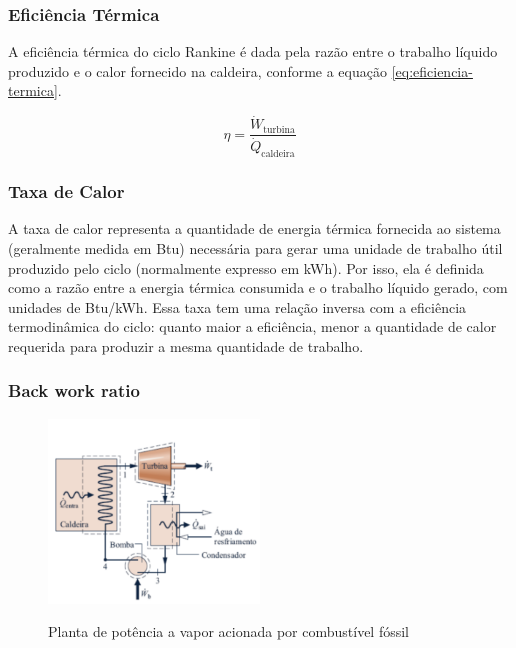 \documentclass[
	article,			%
	11pt,				%
	oneside,			%
	a4paper,			%
	english,			%
	brazil,				%
	sumario=tradicional
	]{abntex2}
\begin{document}
\subsubsection{Eficiência Térmica}

A eficiência térmica do ciclo Rankine é dada pela razão entre o trabalho líquido produzido e o calor fornecido na caldeira, conforme a equação \ref{eq:eficiencia-termica}.

\begin{equation}
	\eta = \frac{\dot{W}_{\text{turbina}}}{\dot{Q}_{\text{caldeira}}}
	\label{eq:eficiencia-termica}
\end{equation}

\subsubsection{Taxa de Calor}

A taxa de calor representa a quantidade de energia térmica fornecida ao sistema (geralmente medida em Btu) necessária para gerar uma unidade de trabalho útil produzido pelo ciclo (normalmente expresso em kWh). Por isso, ela é definida como a razão entre a energia térmica consumida e o trabalho líquido gerado, com unidades de Btu/kWh. Essa taxa tem uma relação inversa com a eficiência termodinâmica do ciclo: quanto maior a eficiência, menor a quantidade de calor requerida para produzir a mesma quantidade de trabalho.

\subsubsection{Back work ratio}

\begin{figure}[h]
	\centering
	\caption{Planta de potência a vapor acionada por combustível fóssil}
	\includegraphics[width=0.5\textwidth]{./images/trabalho-realizado.png}
	\label{fig:trabalho-realizado}
\end{figure}
\end{document}
